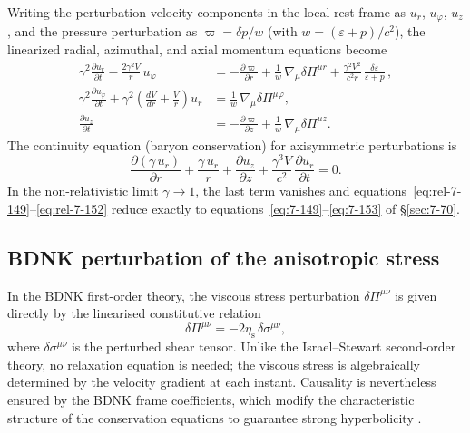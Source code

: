 Writing the perturbation velocity components in the local rest frame
as $u_{r}$, $u_{\varphi}$, $u_{z}$, and the pressure perturbation as
$\varpi=\delta p/w$ (with $w=(\varepsilon+p)/c^{2}$), the linearized
radial, azimuthal, and axial momentum equations become
\begin{align}
\label{eq:rel-7-149}
\gamma^{2}\frac{\partial u_{r}}{\partial t}
  - \frac{2\gamma^{2}V}{r}\,u_{\varphi}
  &= -\frac{\partial\varpi}{\partial r}
  + \frac{1}{w}\,\nabla_{\mu}\delta\Pi^{\mu r}
  + \frac{\gamma^{2}V^{2}}{c^{2}r}\,
    \frac{\delta\varepsilon}{\varepsilon+p}\,,
\\[6pt]
\label{eq:rel-7-150}
\gamma^{2}\frac{\partial u_{\varphi}}{\partial t}
  + \gamma^{2}\!\left(\frac{dV}{dr}+\frac{V}{r}\right)u_{r}
  &= \frac{1}{w}\,\nabla_{\mu}\delta\Pi^{\mu\varphi},
\\[6pt]
\label{eq:rel-7-151}
\frac{\partial u_{z}}{\partial t}
  &= -\frac{\partial\varpi}{\partial z}
  + \frac{1}{w}\,\nabla_{\mu}\delta\Pi^{\mu z}.
\end{align}
The continuity equation (baryon conservation) for axisymmetric
perturbations is
\begin{equation}
\label{eq:rel-7-152}
\frac{\partial(\gamma\,u_{r})}{\partial r}
  + \frac{\gamma\,u_{r}}{r}
  + \frac{\partial u_{z}}{\partial z}
  + \frac{\gamma^{3}V}{c^{2}}\,\frac{\partial u_{r}}{\partial t}
  = 0.
\end{equation}
In the non-relativistic limit $\gamma\to 1$, the last term vanishes
and equations~\eqref{eq:rel-7-149}--\eqref{eq:rel-7-152} reduce
exactly to equations~\eqref{eq:7-149}--\eqref{eq:7-153} of
\S\ref{sec:7-70}.

\subsection{BDNK perturbation of the anisotropic
  stress}\label{sec:rel-7-70b}

In the BDNK first-order theory, the viscous stress perturbation
$\delta\Pi^{\mu\nu}$ is given directly by the linearised constitutive
relation
\begin{equation}
\label{eq:rel-7-153}
\delta\Pi^{\mu\nu}
  = -2\eta_{\mathrm{s}}\,\delta\sigma^{\mu\nu},
\end{equation}
where $\delta\sigma^{\mu\nu}$ is the perturbed shear tensor.
Unlike the Israel--Stewart second-order theory, no relaxation equation
is needed; the viscous stress is algebraically determined by the
velocity gradient at each instant.  Causality is nevertheless ensured
by the BDNK frame coefficients, which modify the characteristic
structure of the conservation equations to guarantee strong
hyperbolicity \citep{BemficaDN2018,Kovtun2019}.

